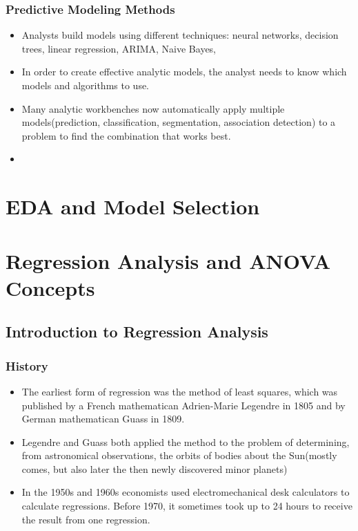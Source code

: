 \documentclass{book}
\begin{document}
\subsection{Predictive Modeling Methods}
\begin{itemize}
\item Analysts build models using different techniques: neural networks, decision trees, linear regression, ARIMA, Naive Bayes,
\item In order to create effective analytic models, the analyst needs to know which models and algorithms to use.
\item Many analytic workbenches now automatically apply multiple models(prediction, classification, segmentation, association detection) to a problem to find the combination that works best.
\item 
\end{itemize}

\chapter{EDA and Model Selection}
\chapter{Regression Analysis and ANOVA Concepts}
\section{Introduction to Regression Analysis}
\subsection{History}
\begin{itemize}
\item The earliest form of regression was the method of least squares, which was published by a French mathematican Adrien-Marie Legendre in 1805 and by German mathematican Guass in 1809.
\item Legendre and Guass both applied the method to the problem of determining, from astronomical observations, the orbits of bodies about the Sun(mostly comes, but also later the then newly discovered minor planets)
\item In the 1950s and 1960s economists used electromechanical desk calculators to calculate regressions. Before 1970, it sometimes took up to 24 hours to receive the result from one regression.
\end{itemize}
\end{document}
